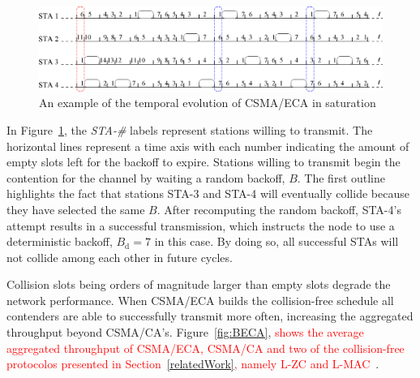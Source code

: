 \begin{figure}[tb]
\centering
  \includegraphics[width=0.8\linewidth]{figures/basicECA.eps}
  \caption{An example of the temporal evolution of CSMA/ECA in saturation}
  \label{fig:BECA-example}
\end{figure}

In Figure~\ref{fig:BECA-example}, the \emph{STA-\#} labels represent stations willing to transmit. The horizontal lines represent a time axis with each number indicating the amount of empty slots left for the backoff to expire. Stations willing to transmit begin the contention for the channel by waiting a random backoff, $B$. The first outline highlights the fact that stations STA-3 and STA-4 will eventually collide because they have selected the same $B$. After recomputing the random backoff, STA-4's attempt results in a successful transmission, which instructs the node to use a deterministic backoff, $B_{\text{d}}=7$ in this case. By doing so, all successful STAs will not collide among each other in future cycles.

Collision slots being orders of magnitude larger than empty slots degrade the network performance. When CSMA/ECA builds the collision-free schedule all contenders are able to successfully transmit more often, increasing the aggregated throughput beyond CSMA/CA's. Figure~\ref{fig:BECA}, \textcolor{red}{shows the average aggregated throughput of CSMA/ECA, CSMA/CA and two of the collision-free protocolos presented in Section~\ref{relatedWork}, namely L-ZC and L-MAC~\cite{L_MAC}}.


